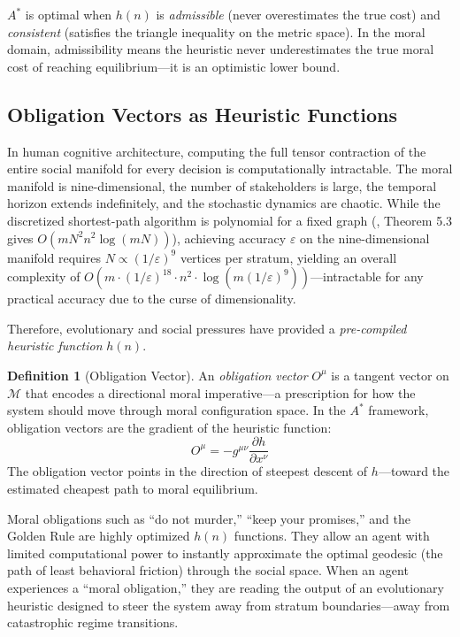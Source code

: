 \documentclass[12pt,letterpaper]{article}
\theoremstyle{definition}
\newtheorem{definition}[theorem]{Definition}
\theoremstyle{remark}
\newcommand{\M}{\mathcal{M}}
\begin{document}
$A^*$ is optimal when $h(n)$ is \emph{admissible} (never overestimates the true cost) and \emph{consistent} (satisfies the triangle inequality on the metric space). In the moral domain, admissibility means the heuristic never underestimates the true moral cost of reaching equilibrium---it is an optimistic lower bound.

\subsection{Obligation Vectors as Heuristic Functions}

In human cognitive architecture, computing the full tensor contraction of the entire social manifold for every decision is computationally intractable. The moral manifold is nine-dimensional, the number of stakeholders is large, the temporal horizon extends indefinitely, and the stochastic dynamics are chaotic. While the discretized shortest-path algorithm is polynomial for a fixed graph (\cite{bond2026sge}, Theorem 5.3 gives $O(mN^2 n^2 \log(mN))$), achieving accuracy $\varepsilon$ on the nine-dimensional manifold requires $N \propto (1/\varepsilon)^9$ vertices per stratum, yielding an overall complexity of $O(m \cdot (1/\varepsilon)^{18} \cdot n^2 \cdot \log(m(1/\varepsilon)^9))$---intractable for any practical accuracy due to the curse of dimensionality.

Therefore, evolutionary and social pressures have provided a \emph{pre-compiled heuristic function} $h(n)$.

\begin{definition}[Obligation Vector]
\label{def:obligation}
An \emph{obligation vector} $O^\mu$ is a tangent vector on $\M$ that encodes a directional moral imperative---a prescription for how the system should move through moral configuration space. In the $A^*$ framework, obligation vectors are the gradient of the heuristic function:
\begin{equation}
O^\mu = -g^{\mu\nu} \frac{\partial h}{\partial x^\nu}
\label{eq:obligation}
\end{equation}
The obligation vector points in the direction of steepest descent of $h$---toward the estimated cheapest path to moral equilibrium.
\end{definition}

Moral obligations such as ``do not murder,'' ``keep your promises,'' and the Golden Rule are highly optimized $h(n)$ functions. They allow an agent with limited computational power to instantly approximate the optimal geodesic (the path of least behavioral friction) through the social space. When an agent experiences a ``moral obligation,'' they are reading the output of an evolutionary heuristic designed to steer the system away from stratum boundaries---away from catastrophic regime transitions.
\end{document}
